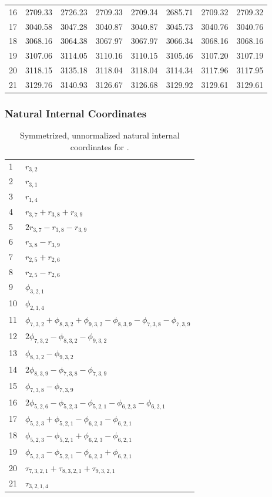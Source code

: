 \documentclass[10pt,oneside]{article}
\begin{document}
\begin{table}[h!]
\begin{tabular}{cccccccc}
16 &   2709.33 & 2726.23 & 2709.33 & 2709.34 &      2685.71 & 2709.32 & 2709.32 \\
17 &   3040.58 & 3047.28 & 3040.87 & 3040.87 &      3045.73 & 3040.76 & 3040.76 \\
18 &   3068.16 & 3064.38 & 3067.97 & 3067.97 &      3066.34 & 3068.16 & 3068.16 \\
19 &   3107.06 & 3114.05 & 3110.16 & 3110.15 &      3105.46 & 3107.20 & 3107.19 \\
20 &   3118.15 & 3135.18 & 3118.04 & 3118.04 &      3114.34 & 3117.96 & 3117.95 \\
21 &   3129.76 & 3140.93 & 3126.67 & 3126.68 &      3129.92 & 3129.61 & 3129.61 \\
\bottomrule
\end{tabular}
\end{table}

\clearpage

\subsubsection*{Natural Internal Coordinates}
\begin{table}[h!]
\centering
\caption{Symmetrized, unnormalized natural internal coordinates for .}
\small
\begin{tabular}{ll}
  1   & $r_{3,2}$ \\
  2   & $r_{3,1}$ \\
  3   & $r_{1,4}$ \\
  4   & $r_{3,7} + r_{3,8} + r_{3,9}$ \\
  5   & $2r_{3,7} - r_{3,8} - r_{3,9}$ \\
  6   & $r_{3,8} - r_{3,9}$ \\
  7   & $r_{2,5} + r_{2,6}$ \\
  8   & $r_{2,5} - r_{2,6}$ \\
  9   & $\phi_{3,2,1}$ \\
  10  & $\phi_{2,1,4}$ \\
  11  & $\phi_{7,3,2} + \phi_{8,3,2} + \phi_{9,3,2} - \phi_{8,3,9} - \phi_{7,3,8} - \phi_{7,3,9}$ \\
  12  & $2\phi_{7,3,2} - \phi_{8,3,2} - \phi_{9,3,2}$ \\
  13  & $\phi_{8,3,2} - \phi_{9,3,2}$ \\
  14  & $2\phi_{8,3,9} - \phi_{7,3,8} - \phi_{7,3,9}$ \\
  15  & $\phi_{7,3,8} - \phi_{7,3,9}$ \\
  16  & $2\phi_{5,2,6} - \phi_{5,2,3} - \phi_{5,2,1} - \phi_{6,2,3} - \phi_{6,2,1}$ \\
  17  & $\phi_{5,2,3} + \phi_{5,2,1} - \phi_{6,2,3} - \phi_{6,2,1}$ \\
  18  & $\phi_{5,2,3} - \phi_{5,2,1} + \phi_{6,2,3} - \phi_{6,2,1}$ \\
  19  & $\phi_{5,2,3} - \phi_{5,2,1} - \phi_{6,2,3} + \phi_{6,2,1}$ \\
  20  & $\tau_{7,3,2,1} + \tau_{8,3,2,1} + \tau_{9,3,2,1}$ \\
  21  & $\tau_{3,2,1,4}$ \\
\end{tabular}
\end{table}
\end{document}
